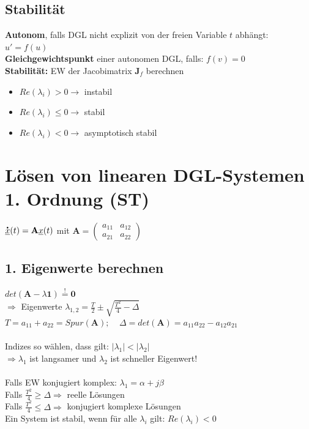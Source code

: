 \documentclass[6pt,a4paper]{scrartcl}
\newcommand{\ma}[1]{\ensuremath{\boldsymbol {#1}}}                                              %
\newcommand{\mustbe}{\stackrel{!}{=}}
\renewcommand*{\dot}[1]{\accentset{\mbox{\textrm{\large\bfseries .}} }{#1}}                     %
\newcommand{\ra}[0]{\ensuremath{\rightarrow}}                                  %
\begin{document}
\begin{multicols*}{4}
    \subsection{Stabilität}
    \textbf{Autonom}, falls DGL nicht explizit von der freien Variable $t$ abhängt: $u'=f(u)$\\
    \textbf{Gleichgewichtspunkt} einer autonomen DGL, falls: $f(v) = 0$\\
    \textbf{Stabilität:} EW der Jacobimatrix $\ma J_f$ berechnen
    \begin{itemize}\itemsep-1pt
        \item $Re(\lambda_i) > 0 \ra$ instabil
        \item $Re(\lambda_i) \le 0 \ra$ stabil
        \item $Re(\lambda_i) < 0 \ra$ asymptotisch stabil
    \end{itemize}

    \section{Lösen von linearen DGL-Systemen 1. Ordnung (ST)}
    $\dot {\underline{x}}(t)=\textbf{A}\underline{x}(t)$ \quad mit \quad
    $\textbf{A} = \begin{pmatrix}
            a_{11} & a_{12} \\
            a_{21} & a_{22}
        \end{pmatrix}$
    \subsection*{1. Eigenwerte berechnen}
    $det(\textbf{A}-\lambda \textbf{1})\mustbe \textbf{0}$\\
    $\Rightarrow$ Eigenwerte $\lambda_{1,2}=\frac{T}{2}\pm \sqrt{\frac{T^2}{4}-\Delta}$\\
    $T=a_{11}+a_{22}=Spur(\textbf{A});\;\;\;\;\Delta =det(\textbf{A})=a_{11}a_{22}-a_{12}a_{21}$\\\\
    Indizes so wählen, dass gilt: $|\lambda_1|<|\lambda_2|$\\
    $\Rightarrow \lambda_1$ ist langsamer und $\lambda_2$ ist schneller Eigenwert!\\\\
    Falls EW konjugiert komplex: $\lambda_1=\alpha +j\beta$\\
    Falls $\frac{T^2}{4}\ge \Delta \Rightarrow$ reelle Lösungen\\
    Falls $\frac{T^2}{4}\le \Delta \Rightarrow$ konjugiert komplexe Lösungen\\
    Ein System ist stabil, wenn für alle $\lambda_i$ gilt: $Re(\lambda_i)<0$

\end{multicols*}
\end{document}
